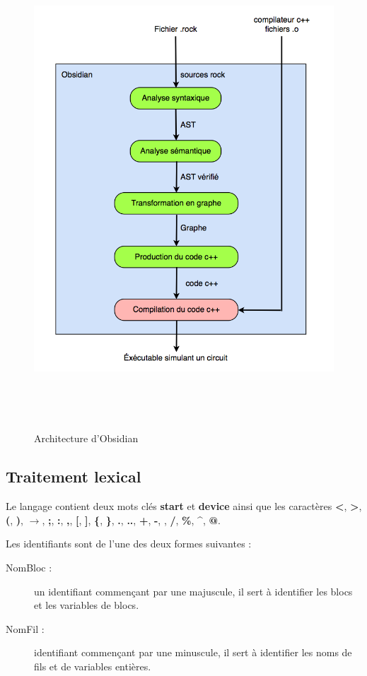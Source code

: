 \documentclass[13pt]{article}
\begin{document}
\begin{figure}[!h]
\centering
\includegraphics[width=14.7cm,height=17.96cm]{obsidian.png}
\caption{Architecture d'Obsidian}
\label{Architecture d'Obsidian}
\end{figure}

\subsection{Traitement lexical}
Le langage contient deux mots clés {\bf start} et {\bf device } ainsi que les
caractères {\bf <}, {\bf >}, {\bf (}, {\bf )}, {\bf $\to$}, {\bf ;}, {\bf :}, {\bf ,},
{\bf [}, {\bf ]}, {\bf \{}, {\bf \}}, {\bf .}, {\bf ..}, {\bf +}, {\bf -}, {\bf *}, {\bf /},
{\bf \%}, {\bf \^{}}, {\bf @}. 

Les identifiants sont de l'une des deux formes suivantes :
\begin{description}
\item[NomBloc : ] un identifiant commençant par une majuscule, il sert à
  identifier les blocs et les variables de blocs.
\item[NomFil : ] identifiant commençant par une minuscule, il sert à identifier
  les noms de fils et de variables entières.
\end{description}
\end{document}

